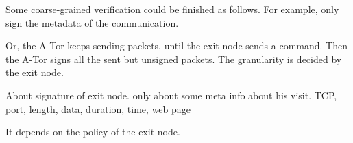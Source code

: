Some coarse-grained verification could be finished as follows.
For example,
  only sign the metadata of the communication.

Or, the A-Tor keeps sending  packets, until the exit node sends a command.
Then the A-Tor signs all the sent but unsigned packets.
The granularity is decided by the exit node.




About signature of exit node.
only about some meta info about his visit.
{TCP, port, length, data, duration, time, web page}

It depends on the policy of the exit node.

